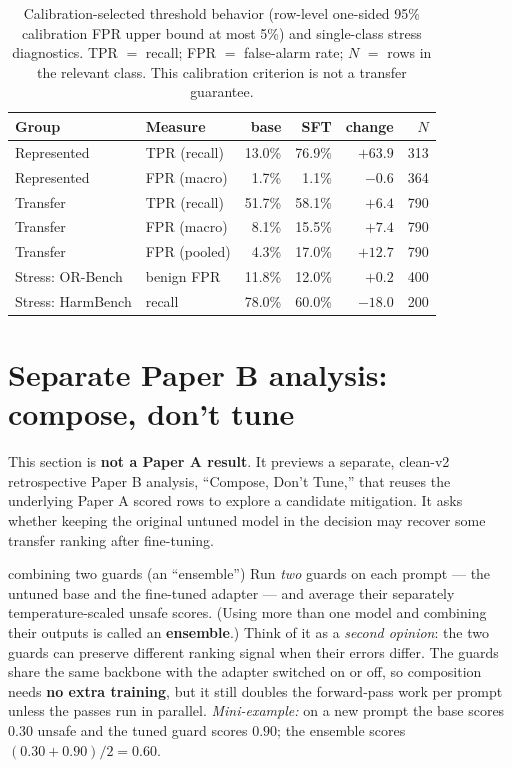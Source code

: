 \documentclass[11pt]{article}
\begin{document}
\begin{table}[t]
\centering\small
\caption{Calibration-selected threshold behavior (row-level one-sided 95\% calibration FPR upper bound
at most 5\%) and single-class stress diagnostics. TPR $=$ recall; FPR $=$ false-alarm rate;
$N$ $=$ rows in the relevant class. This calibration criterion is not a transfer guarantee.}
\label{tab:op}
\begin{tabular}{ll rr r r}
\toprule
Group & Measure & base & SFT & change & $N$ \\
\midrule
Represented & TPR (recall) & 13.0\% & 76.9\% & $+63.9$ & 313 \\
Represented & FPR (macro)  & 1.7\%  & 1.1\%  & $-0.6$  & 364 \\
Transfer    & TPR (recall) & 51.7\% & 58.1\% & $+6.4$  & 790 \\
Transfer    & FPR (macro)  & 8.1\%  & 15.5\% & $+7.4$  & 790 \\
Transfer    & FPR (pooled) & 4.3\%  & 17.0\% & $+12.7$ & 790 \\
\midrule
Stress: OR-Bench & benign FPR & 11.8\% & 12.0\% & $+0.2$ & 400 \\
Stress: HarmBench & recall    & 78.0\% & 60.0\% & $-18.0$ & 200 \\
\bottomrule
\end{tabular}
\end{table}

\section{Separate Paper B analysis: compose, don't tune}
\label{sec:fix}
This section is \textbf{not a Paper A result}. It previews a separate, clean-v2 retrospective Paper B
analysis, ``Compose, Don't Tune,'' that reuses the underlying Paper A scored rows to explore a
candidate mitigation. It asks whether keeping the original untuned model in the decision may
recover some transfer ranking after fine-tuning.

\begin{background}{combining two guards (an ``ensemble'')}
\small
Run \emph{two} guards on each prompt --- the untuned base and the fine-tuned adapter --- and
average their separately temperature-scaled unsafe scores. (Using more than one model and combining
their outputs is called an \textbf{ensemble}.) Think of it as a \emph{second opinion}: the
two guards can preserve different ranking signal when their errors differ. The guards share the
same backbone with the adapter switched on or off, so composition needs \textbf{no extra training},
but it still doubles the forward-pass work per prompt unless the passes run in parallel.
\emph{Mini-example:} on a new prompt the base scores $0.30$
unsafe and the tuned guard scores $0.90$; the ensemble scores $(0.30+0.90)/2 = 0.60$.
\end{background}
\end{document}
